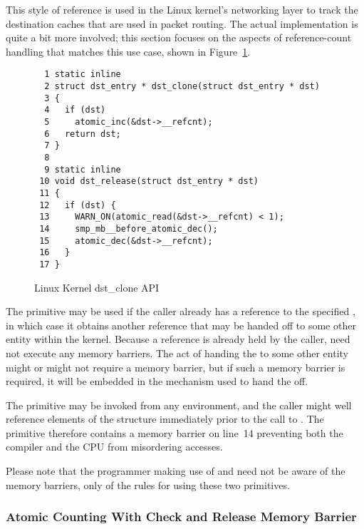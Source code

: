 This style of reference is used in the Linux kernel's networking
layer to track the destination caches that are used in packet routing.
The actual implementation is quite a bit more involved; this section
focuses on the aspects of  reference-count
handling that matches this use case,
shown in Figure~\ref{fig:defer:Linux Kernel dst-clone API}.

\begin{figure}[htbp]
{ \scriptsize
\begin{verbatim}
  1 static inline
  2 struct dst_entry * dst_clone(struct dst_entry * dst)
  3 {
  4   if (dst)
  5     atomic_inc(&dst->__refcnt);
  6   return dst;
  7 }
  8
  9 static inline
 10 void dst_release(struct dst_entry * dst)
 11 {
 12   if (dst) {
 13     WARN_ON(atomic_read(&dst->__refcnt) < 1);
 14     smp_mb__before_atomic_dec();
 15     atomic_dec(&dst->__refcnt);
 16   }
 17 }
\end{verbatim}
}
\caption{Linux Kernel dst\_clone API}
\label{fig:defer:Linux Kernel dst-clone API}
\end{figure}

The  primitive may be used if the caller
already has a reference to the specified ,
in which case it obtains another reference that may be handed off
to some other entity within the kernel.
Because a reference is already held by the caller, 
need not execute any memory barriers.
The act of handing the  to some other entity might
or might not require a memory barrier, but if such a memory barrier
is required, it will be embedded in the mechanism used to hand the
 off.

The  primitive may be invoked from any environment,
and the caller might well reference elements of the 
structure immediately prior to the call to .
The  primitive therefore contains a memory
barrier on line~14 preventing both the compiler and the CPU
from misordering accesses.

Please note that the programmer making use of  and
 need not be aware of the memory barriers, only
of the rules for using these two primitives.

\subsubsection{Atomic Counting With Check and Release Memory Barrier}
\label{sec:defer:Atomic Counting With Check and Release Memory Barrier}

